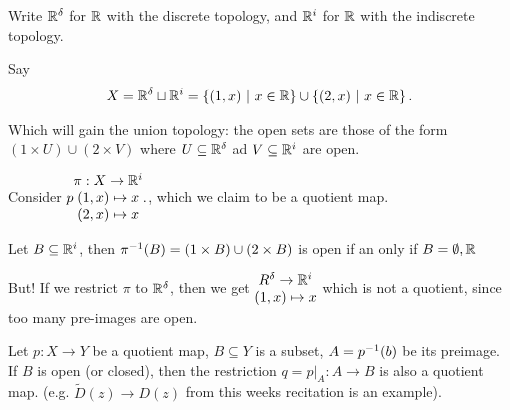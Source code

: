 \documentclass[12pt, twosided]{article}
\begin{document}
\begin{exa}
  Write \(\mathbb{R}^\delta\) for \(\mathbb{R}\) with the discrete topology, and \(\mathbb{R}^i\) for \(\mathbb{R}\) with the indiscrete topology.

  Say
  \begin{align*}
    X = \mathbb{R}^\delta \sqcup \mathbb{R}^i = \left\{ (1, x) \ \middle\vert\  x \in \mathbb{R} \right\} \cup \left\{ (2, x) \ \middle\vert\  x \in \mathbb{R} \right\}.
  \end{align*}

  Which will gain the union topology: the open sets are those of the form \((1 \times U) \cup (2 \times V)\) where \(U \subseteq \mathbb{R}^\delta\) ad \(V \subseteq \mathbb{R}^i\) are open.

  Consider \(p
  \begin{matrix}
    \pi: X \to \mathbb{R}^i \\ (1, x) \mapsto x \\ (2, x) \mapsto x
  \end{matrix}.
  \), which we claim to be a quotient map.


  Let \(B \subseteq \mathbb{R}^i\), then \(\pi^{-1}(B) = (1 \times B)\cup (2 \times B)\) is open if an only if \(B = \emptyset, \mathbb{R}\)

  But! If we restrict \(\pi\) to \(\mathbb{R}^\delta\), then we get \(
  \begin{matrix}

    R^\delta \to \mathbb{R}^i \\ (1, x) \mapsto x
  \end{matrix}
  \) which is not a quotient, since too many pre-images are open.
\end{exa}

\begin{lm}
  Let \(p:X \to Y\) be a quotient map, \(B \subseteq Y\) is a subset, \(A = p^{-1}(b)\) be its preimage. If \(B\) is open (or closed), then the restriction \(q = p\vert_A: A \to B\) is also a quotient map. (e.g. \(\widetilde{D}(z) \to D(z) \) from this weeks recitation is an example).
\end{lm}
\end{document}
